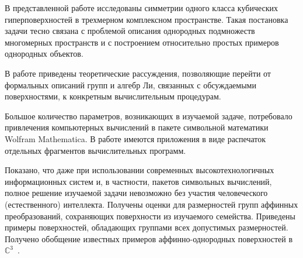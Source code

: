 \documentclass[../main.tex]{subfiles}
\begin{document}
В представленной работе исследованы симметрии одного класса кубических гиперповерхностей в трехмерном комплексном пространстве. Такая постановка задачи тесно связана с проблемой описания однородных подмножеств многомерных пространств и с построением относительно простых примеров  однородных объектов.  

В работе приведены теоретические рассуждения, позволяющие перейти от формальных описаний групп и алгебр Ли, связанных с обсуждаемыми поверхностями, к конкретным вычислительным процедурам.

Большое количество параметров, возникающих в изучаемой задаче, потребовало привлечения  компьютерных вычислений в пакете символьной математики {\ttfamily Wolfram Mathematica}. В работе  имеются  приложения в виде распечаток отдельных фрагментов вычислительных программ. 

Показано, что даже при использовании современных высокотехнологичных информационных систем и, в частности, пакетов символьных вычислений, полное решение изучаемой задачи невозможно без участия человеческого (естественного) интеллекта. Получены оценки для размерностей групп аффинных преобразований, сохраняющих поверхности из изучаемого семейства.  Приведены примеры поверхностей, обладающих группами всех допустимых размерностей.  Получено обобщение известных примеров аффинно-однородных поверхностей в $\mathbb{C}^3$~\cite{ALS}.
\end{document}
